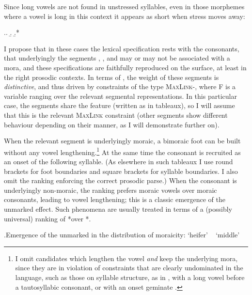 Since long vowels are not found in unstressed syllables, even in those morphemes where a vowel is long in this context it appears as short when stress moves away:

\ex.\a.
\b.
\b.*\mbi{[eːˈɡiːno]}

I propose that in these cases the lexical specification rests with the consonants, \ie that underlyingly the segments \ipa{[n]}, \ipa{[l]}, and \ipa{[r]} may or may not be associated with a mora, and these specifications are faithfully reproduced on the surface, at least in the right prosodic contexts. In terms of \citet{moren01:_distin}, the weight of these segments is \emph{distinctive}, and thus driven by constraints of the type \textsc{MaxLink}-\mo[F], where F is a variable ranging over the relevant segmental representations. In this particular case, the segments \ipa{[n~l~r]} share the feature  (written as  in tableaux), so I will assume that this is the relevant \textsc{MaxLink} constraint (other  segments show different behaviour depending on their manner, as I will demonstrate further on).

When the relevant segment is underlyingly moraic, a bimoraic foot can be built without any vowel lengthening.\footnote{I omit candidates which lengthen the vowel \emph{and} keep the underlying mora, since they are in violation of constraints that are clearly undominated in the language, such as those on syllable structure, as in \mbox{}, with a long vowel before a tautosyllabic consonant, or  with an onset geminate \citep{topintzi08}.} At the same time the consonant is recruited as an onset of the following syllable. (As elsewhere in such tableaux I use round brackets for foot boundaries and square brackets for syllable boundaries. I also omit the ranking enforcing the correct prosodic parse.) When the consonant is underlyingly non-moraic, the ranking prefers moraic vowels over moraic consonants, leading to vowel lengthening; this is a classic emergence of the unmarked effect. Such phenomena are usually treated in terms of a (possibly universal) ranking of *\mo[C] over *\mo[V] \citep[\cfm][]{zec88:_sonor,zec95,ot,moren01:_distin,delacy2006}.

\ex.Emergence of the unmarked in the distribution of moraicity: \ipa{[ˈaner]} `heifer' \vs\ \ipa{[ˈkaːnol]} `middle'\\
\begin{OTmultitableau}{5}
\OTmcandrow[][\OThand]{[a\smo[n\smo]er]}{,*,*,*}
\OTmcandrow[/kanol/]{[ka\smo [n\smo]ol]}{,*!,*,*}
\end{OTmultitableau}


